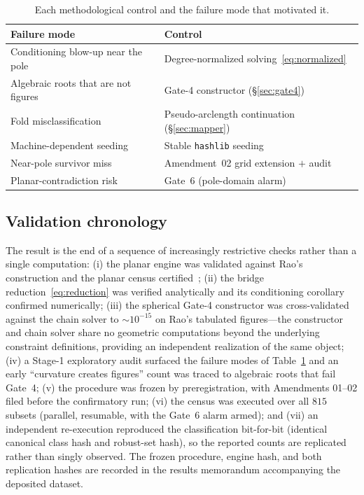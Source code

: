 \documentclass[11pt]{article}
\begin{document}
\begin{table}[htbp]
\centering
\caption{Each methodological control and the failure mode that motivated it.}
\label{tab:audit}
\begin{tabular}{ll}
\hline
Failure mode & Control \\
\hline
Conditioning blow-up near the pole & Degree-normalized solving~\eqref{eq:normalized} \\
Algebraic roots that are not figures & Gate-4 constructor (\S\ref{sec:gate4}) \\
Fold misclassification & Pseudo-arclength continuation (\S\ref{sec:mapper}) \\
Machine-dependent seeding & Stable \texttt{hashlib} seeding \\
Near-pole survivor miss & Amendment~02 grid extension $+$ audit \\
Planar-contradiction risk & Gate~6 (pole-domain alarm) \\
\hline
\end{tabular}
\end{table}

\subsection{Validation chronology}
\label{sec:chronology}

The result is the end of a sequence of increasingly restrictive checks rather
than a single computation:
(i) the planar engine was validated against Rao's construction and the planar
census certified~\cite{plane-census};
(ii) the bridge reduction~\eqref{eq:reduction} was verified analytically and its conditioning corollary confirmed numerically;
(iii) the spherical Gate-4 constructor was cross-validated against the chain
solver to $\sim\!10^{-15}$ on Rao's tabulated figures---the constructor and chain solver share no geometric computations beyond the underlying constraint
definitions, providing an independent realization of the same object;
(iv) a Stage-1 exploratory audit surfaced the failure modes of
Table~\ref{tab:audit} and an early ``curvature creates figures'' count was traced to algebraic roots that fail Gate~4;
(v) the procedure was frozen by preregistration, with Amendments 01--02 filed
before the confirmatory run;
(vi) the census was executed over all $815$ subsets (parallel, resumable, with the Gate~6 alarm armed); and
(vii) an independent re-execution reproduced the classification bit-for-bit
(identical canonical class hash and robust-set hash), so the reported counts are replicated rather than singly observed. The frozen procedure, engine hash, and both replication hashes are recorded in the results memorandum accompanying the deposited dataset.
\end{document}
